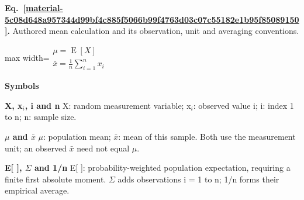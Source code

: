 \documentclass[11pt,a4paper]{article}
\begin{document}
\par\medskip
\noindent\begin{minipage}{\linewidth}
\label{material-5c08d648a957344d99bf4c885f5066b99f4763d03c07c55182e1b95f85089150}
\noindent\textbf{Eq.~\ref*{material-5c08d648a957344d99bf4c885f5066b99f4763d03c07c55182e1b95f85089150}.} Authored mean calculation and its observation, unit and averaging conventions.\par\nopagebreak
\begin{center}\begin{adjustbox}{max width=\linewidth}$\displaystyle \begin{gathered}\mu=\operatorname{E}[X]\\\bar{x}=\frac1n\sum_{i=1}^{n}x_i\end{gathered}$\end{adjustbox}\end{center}

\par\noindent\textbf{Symbols}

\par\noindent\textbf{X, x\ensuremath{{}_i}, i and n} X: random measurement variable; x\ensuremath{{}_i}: observed value i; i: index 1 to n; n: sample size.

\par\noindent\textbf{\ensuremath{\mu} and \ensuremath{\bar{x}}} \ensuremath{\mu}: population mean; \ensuremath{\bar{x}}: mean of this sample. Both use the measurement unit; an observed \ensuremath{\bar{x}} need not equal \ensuremath{\mu}.

\par\noindent\textbf{E[ ], \ensuremath{\Sigma} and 1/n} E[ ]: probability-weighted population expectation, requiring a finite first absolute moment. \ensuremath{\Sigma} adds observations i = 1 to n; 1/n forms their empirical average.

\end{minipage}\par
\medskip
\end{document}
